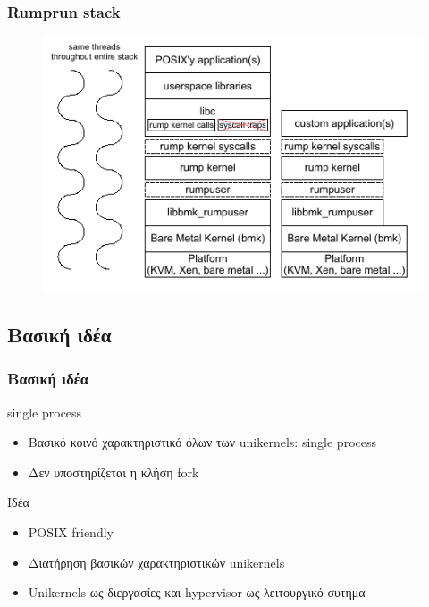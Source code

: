 \documentclass[red,slidestop,notes,compress,mathserif]{beamer}
\begin{document}
\begin{frame}
\frametitle{Rumprun stack}
\begin{figure}
\center
	\includegraphics[scale=0.5]{figures/rumprun_stack.png}
\end{figure}
\end{frame}

\subsection{Βασική ιδέα}
\begin{frame}
\frametitle{Βασική ιδέα}
\begin{block}{single process}
\begin{itemize}
\item Βασικό κοινό χαρακτηριστικό όλων των unikernels: single process
\item Δεν υποστηρίζεται η κλήση fork
\end{itemize}
\end{block}
\begin{block}{Ιδέα}
\begin{itemize}
\item POSIX friendly 
\item Διατήρηση βασικών χαρακτηριστικών unikernels
\item Unikernels ως διεργασίες και hypervisor ως λειτουργικό συτημα
\end{itemize}
\end{block}
\end{frame}
\end{document}
